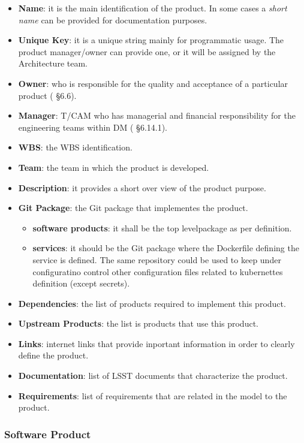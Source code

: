 \begin{itemize}
  \item \textbf{Name}: it is the main identification of the product. In some cases a \textit{short name} can be provided for documentation purposes.
  \item \textbf{Unique Key}: it is a unique string mainly for programmatic usage. The product manager/owner can provide one, or it will be assigned by the Architecture team.
  \item \textbf{Owner}: who is responsible for the quality and acceptance of a particular product ( \S6.6).
  \item \textbf{Manager}: {T/CAM} who has managerial and financial responsibility for the engineering teams within DM ( \S6.14.1).
  \item \textbf{WBS}: the WBS identification.
  \item \textbf{Team}: the team in which the product is developed.
  \item \textbf{Description}: it provides a short over view of the product purpose.
  \item \textbf{Git Package}: the Git package that implementes the product.
  \begin{itemize}
    \item \textbf{software products}: it shall be the top levelpackage as per  definition. 
    \item \textbf{services}: it should be the Git package where the Dockerfile defining the service is defined. The same repository could be used to keep under configuratino control other configuration files related to kubernettes definition (except secrets).
  \end{itemize}
  \item \textbf{Dependencies}: the list of products required to implement this product.
  \item \textbf{Upstream Products}: the list is products that use this product.
  \item \textbf{Links}: internet links that provide inportant information in order to clearly define the product.
  \item \textbf{Documentation}: list of LSST documents that characterize the product.
  \item \textbf{Requirements}: list of requirements that are related in the model to the product.
\end{itemize}


\subsubsection{Software Product} \label{sec:swproduct}

